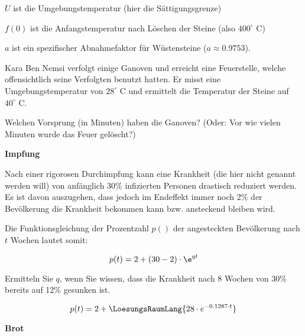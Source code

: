 $U$ ist die Umgebungstemperatur (hier die Sättigungsgrenze)

$f(0)$ ist die Anfangstemperatur nach Löschen der Steine (also $400^\circ$ C)

$a$ ist ein spezifischer Abnahmefaktor für Wüstensteine ($a\approx 0.9753$).


Kara Ben Nemsi verfolgt einige Ganoven und erreicht eine Feuerstelle, welche offensichtlich seine Verfolgten benutzt hatten. Er misst eine Umgebungstemperatur von $28^\circ$ C und ermittelt die Temperatur der Steine auf $40^\circ$ C.

Welchen Vorsprung (in Minuten) haben die Ganoven? (Oder: Vor wie vielen Minuten wurde das Feuer gelöscht?)


\platzFuerBerechnungenBisEndeSeite{}




\bbwActAufgabenNr{} \textbf{Impfung}
\nextBbwAufgabenNummer{}

Nach einer rigorosen Durchimpfung kann eine Krankheit (die hier nicht genannt werden will) von anfänglich 30\% infizierten Personen drastisch reduziert werden. Es ist davon auszugehen, dass jedoch im Endeffekt immer noch 2\% der Bevölkerung die Krankheit bekommen kann bzw. ansteckend bleiben wird.

Die Funktionsgleichung der Prozentzahl $p()$ der angesteckten Bevölkerung nach $t$ Wochen lautet somit:

$$p(t) = 2 + (30-2)\cdot \e^{qt}$$

Ermitteln Sie $q$, wenn Sie wissen, dass die Krankheit nach 8 Wochen von 30\% bereits auf 12\% gesunken ist.

$$p(t) = 2 + \LoesungsRaumLang{28\cdot{}e^{-0.1287\cdot{}t}}$$


\platzFuerBerechnungenBisEndeSeite{}



\bbwActAufgabenNr{} \textbf{Brot}

